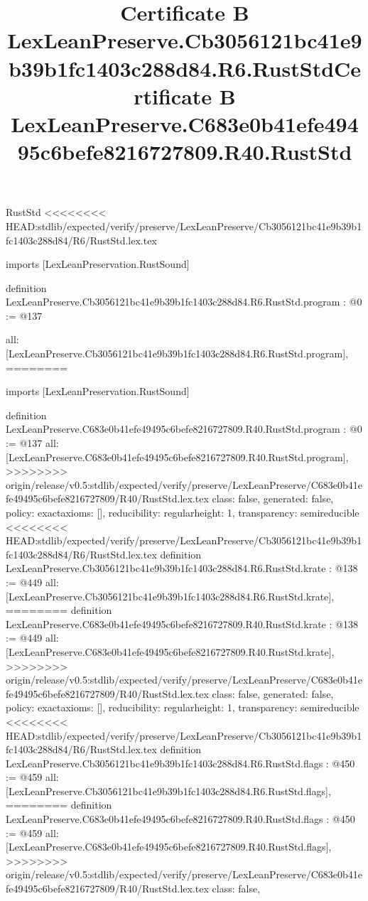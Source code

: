 \begin{lexlean}{RustStd}
<<<<<<<< HEAD:stdlib/expected/verify/preserve/LexLeanPreserve/Cb3056121bc41e9b39b1fc1403c288d84/R6/RustStd.lex.tex
\title{Certificate B LexLeanPreserve.Cb3056121bc41e9b39b1fc1403c288d84.R6.RustStd}
\begin{coremodule}
imports [LexLeanPreservation.RustSound]

definition LexLeanPreserve.Cb3056121bc41e9b39b1fc1403c288d84.R6.RustStd.program : @0 := @137 {
  all: [LexLeanPreserve.Cb3056121bc41e9b39b1fc1403c288d84.R6.RustStd.program],
========
\title{Certificate B LexLeanPreserve.C683e0b41efe49495c6befe8216727809.R40.RustStd}
\begin{coremodule}
imports [LexLeanPreservation.RustSound]

definition LexLeanPreserve.C683e0b41efe49495c6befe8216727809.R40.RustStd.program : @0 := @137 {
  all: [LexLeanPreserve.C683e0b41efe49495c6befe8216727809.R40.RustStd.program],
>>>>>>>> origin/release/v0.5:stdlib/expected/verify/preserve/LexLeanPreserve/C683e0b41efe49495c6befe8216727809/R40/RustStd.lex.tex
  class: false,
  generated: false,
  policy: exact{axioms: []},
  reducibility: regular{height: 1},
  transparency: semireducible
}
<<<<<<<< HEAD:stdlib/expected/verify/preserve/LexLeanPreserve/Cb3056121bc41e9b39b1fc1403c288d84/R6/RustStd.lex.tex
definition LexLeanPreserve.Cb3056121bc41e9b39b1fc1403c288d84.R6.RustStd.krate : @138 := @449 {
  all: [LexLeanPreserve.Cb3056121bc41e9b39b1fc1403c288d84.R6.RustStd.krate],
========
definition LexLeanPreserve.C683e0b41efe49495c6befe8216727809.R40.RustStd.krate : @138 := @449 {
  all: [LexLeanPreserve.C683e0b41efe49495c6befe8216727809.R40.RustStd.krate],
>>>>>>>> origin/release/v0.5:stdlib/expected/verify/preserve/LexLeanPreserve/C683e0b41efe49495c6befe8216727809/R40/RustStd.lex.tex
  class: false,
  generated: false,
  policy: exact{axioms: []},
  reducibility: regular{height: 1},
  transparency: semireducible
}
<<<<<<<< HEAD:stdlib/expected/verify/preserve/LexLeanPreserve/Cb3056121bc41e9b39b1fc1403c288d84/R6/RustStd.lex.tex
definition LexLeanPreserve.Cb3056121bc41e9b39b1fc1403c288d84.R6.RustStd.flags : @450 := @459 {
  all: [LexLeanPreserve.Cb3056121bc41e9b39b1fc1403c288d84.R6.RustStd.flags],
========
definition LexLeanPreserve.C683e0b41efe49495c6befe8216727809.R40.RustStd.flags : @450 := @459 {
  all: [LexLeanPreserve.C683e0b41efe49495c6befe8216727809.R40.RustStd.flags],
>>>>>>>> origin/release/v0.5:stdlib/expected/verify/preserve/LexLeanPreserve/C683e0b41efe49495c6befe8216727809/R40/RustStd.lex.tex
  class: false,
}}}
\end{coremodule}}
\end{coremodule}
\end{lexlean}
